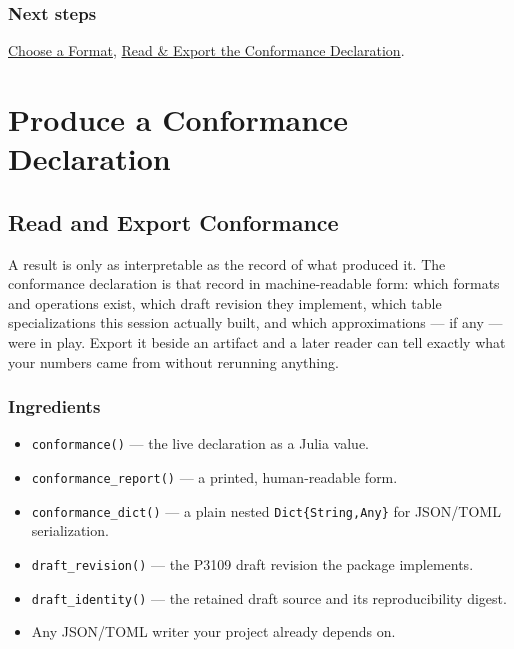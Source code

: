 \subsection{Next steps}



\label{3807517405601295309-dup5}{}


\href{workflow\_\allowbreak{}choose\_\allowbreak{}format.md}{Choose a Format}, \href{workflow\_\allowbreak{}conformance.md}{Read \& Export the Conformance Declaration}.



\chapter{Produce a Conformance Declaration}


\section{Read and Export Conformance}



\label{2836120335316624680}{}


A result is only as interpretable as the record of what produced it. The conformance declaration is that record in machine-readable form: which formats and operations exist, which draft revision they implement, which table specializations this session actually built, and which approximations — if any — were in play. Export it beside an artifact and a later reader can tell exactly what your numbers came from without rerunning anything.



\subsection{Ingredients}



\label{13776634711169142479-dup4}{}


\begin{itemize}
\item \texttt{conformance()} — the live declaration as a Julia value.


\item \texttt{conformance\_\allowbreak{}report()} — a printed, human-readable form.


\item \texttt{conformance\_\allowbreak{}dict()} — a plain nested \texttt{Dict\{String,Any\}} for JSON/TOML serialization.


\item \texttt{draft\_\allowbreak{}revision()} — the P3109 draft revision the package implements.


\item \texttt{draft\_\allowbreak{}identity()} — the retained draft source and its reproducibility digest.


\item Any JSON/TOML writer your project already depends on.

\end{itemize}


